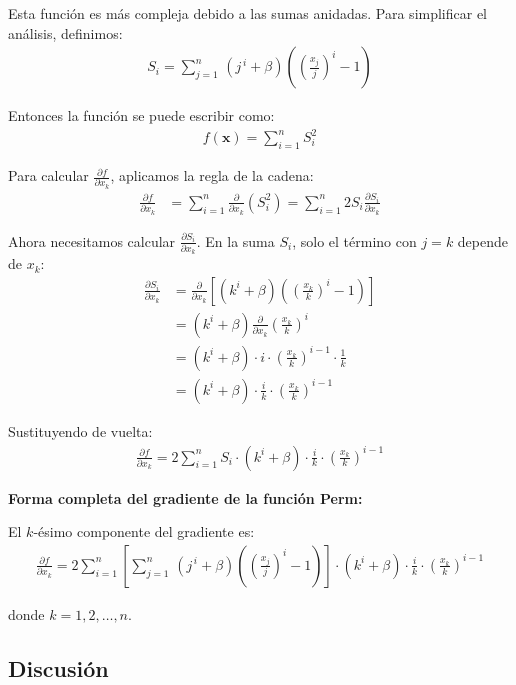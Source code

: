 \documentclass{article}
\begin{document}
Esta función es más compleja debido a las sumas anidadas. Para simplificar el análisis, definimos:
\begin{align}
S_i = \sum_{j=1}^{n}\,(j^{\,i} + \beta)\left( \left(\frac{x_j}{j}\right)^{i} - 1 \right)
\end{align}

Entonces la función se puede escribir como:
\begin{align}
f(\mathbf{x}) = \sum_{i=1}^{n} S_i^2
\end{align}

Para calcular $\frac{\partial f}{\partial x_k}$, aplicamos la regla de la cadena:
\begin{align}
\frac{\partial f}{\partial x_k} &= \sum_{i=1}^{n} \frac{\partial}{\partial x_k}(S_i^2) = \sum_{i=1}^{n} 2S_i \frac{\partial S_i}{\partial x_k}
\end{align}

Ahora necesitamos calcular $\frac{\partial S_i}{\partial x_k}$. En la suma $S_i$, solo el término con $j = k$ depende de $x_k$:
\begin{align}
\frac{\partial S_i}{\partial x_k} &= \frac{\partial}{\partial x_k}\left[(k^i + \beta)\left( \left(\frac{x_k}{k}\right)^{i} - 1 \right)\right] \\
&= (k^i + \beta) \frac{\partial}{\partial x_k}\left(\frac{x_k}{k}\right)^{i} \\
&= (k^i + \beta) \cdot i \cdot \left(\frac{x_k}{k}\right)^{i-1} \cdot \frac{1}{k} \\
&= (k^i + \beta) \cdot \frac{i}{k} \cdot \left(\frac{x_k}{k}\right)^{i-1}
\end{align}

Sustituyendo de vuelta:
\begin{align}
\frac{\partial f}{\partial x_k} = 2\sum_{i=1}^{n} S_i \cdot (k^i + \beta) \cdot \frac{i}{k} \cdot \left(\frac{x_k}{k}\right)^{i-1}
\end{align}

\textbf{Forma completa del gradiente de la función Perm:}

El $k$-ésimo componente del gradiente es:
\begin{align}
\frac{\partial f}{\partial x_k} = 2\sum_{i=1}^{n} \left[ \sum_{j=1}^{n}\,(j^{\,i} + \beta)\left( \left(\frac{x_j}{j}\right)^{i} - 1 \right) \right] \cdot (k^i + \beta) \cdot \frac{i}{k} \cdot \left(\frac{x_k}{k}\right)^{i-1}
\end{align}

donde $k = 1, 2, \ldots, n$.

\subsection{Discusión}
\end{document}
